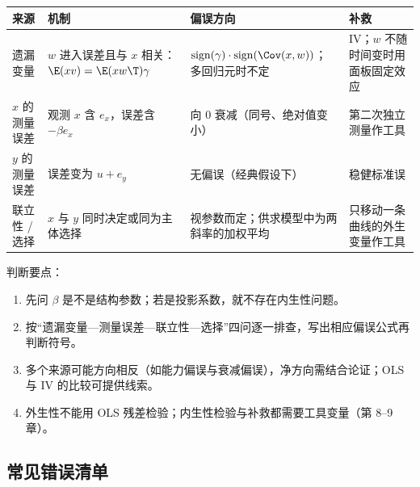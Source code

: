 \begin{center}
\small
\begin{tabularx}{\linewidth}{>{\raggedright\arraybackslash}p{2.0cm}LL>{\raggedright\arraybackslash}p{3.3cm}}
\toprule
来源 & 机制 & 偏误方向 & 补救\\
\midrule
遗漏变量 & $w$ 进入误差且与 $x$ 相关：$\E(xv)=\E(xw\T)\gamma$ & $\operatorname{sign}(\gamma)\cdot\operatorname{sign}(\Cov(x,w))$；多回归元时不定 & IV；$w$ 不随时间变时用面板固定效应\\
$x$ 的测量误差 & 观测 $x$ 含 $e_x$，误差含 $-\beta e_x$ & 向 0 衰减（同号、绝对值变小） & 第二次独立测量作工具\\
$y$ 的测量误差 & 误差变为 $u+e_y$ & 无偏误（经典假设下） & 稳健标准误\\
联立性 / 选择 & $x$ 与 $y$ 同时决定或同为主体选择 & 视参数而定；供求模型中为两斜率的加权平均 & 只移动一条曲线的外生变量作工具\\
\bottomrule
\end{tabularx}
\end{center}

判断要点：
\begin{enumerate}
  \item 先问 $\beta$ 是不是结构参数；若是投影系数，就不存在内生性问题。
  \item 按“遗漏变量—测量误差—联立性—选择”四问逐一排查，写出相应偏误公式再判断符号。
  \item 多个来源可能方向相反（如能力偏误与衰减偏误），净方向需结合论证；OLS 与 IV 的比较可提供线索。
  \item 外生性不能用 OLS 残差检验；内生性检验与补救都需要工具变量（第 8--9 章）。
\end{enumerate}

\subsection{常见错误清单}

